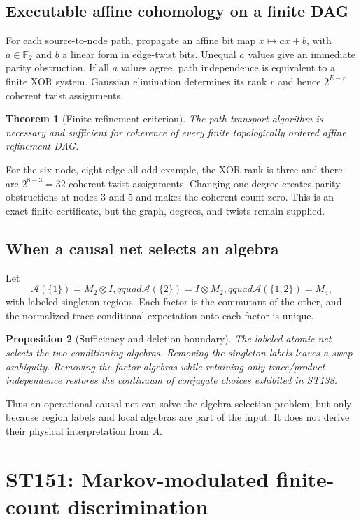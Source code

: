 \documentclass[11pt,a4paper]{article}
\newtheorem{theorem}{Theorem}[section]
\newtheorem{proposition}[theorem]{Proposition}
\begin{document}
\subsection{Executable affine cohomology on a finite DAG}

For each source-to-node path, propagate an affine bit map $x\mapsto ax+b$, with $a\in\mathbb F_2$ and $b$ a linear form in edge-twist bits. Unequal $a$ values give an immediate parity obstruction. If all $a$ values agree, path independence is equivalent to a finite XOR system. Gaussian elimination determines its rank $r$ and hence $2^{E-r}$ coherent twist assignments.

\begin{theorem}[Finite refinement criterion]
The path-transport algorithm is necessary and sufficient for coherence of every finite topologically ordered affine refinement DAG.
\end{theorem}

For the six-node, eight-edge all-odd example, the XOR rank is three and there are $2^{8-3}=32$ coherent twist assignments. Changing one degree creates parity obstructions at nodes 3 and 5 and makes the coherent count zero. This is an exact finite certificate, but the graph, degrees, and twists remain supplied.

\subsection{When a causal net selects an algebra}

Let
\[
\mathcal A(\{1\})=M_2\otimes I,qquad
\mathcal A(\{2\})=I\otimes M_2,qquad
\mathcal A(\{1,2\})=M_4,
\]
with labeled singleton regions. Each factor is the commutant of the other, and the normalized-trace conditional expectation onto each factor is unique.

\begin{proposition}[Sufficiency and deletion boundary]
The labeled atomic net selects the two conditioning algebras. Removing the singleton labels leaves a swap ambiguity. Removing the factor algebras while retaining only trace/product independence restores the continuum of conjugate choices exhibited in ST138.
\end{proposition}

Thus an operational causal net can solve the algebra-selection problem, but only because region labels and local algebras are part of the input. It does not derive their physical interpretation from $A$.

\section{ST151: Markov-modulated finite-count discrimination}
\end{document}
